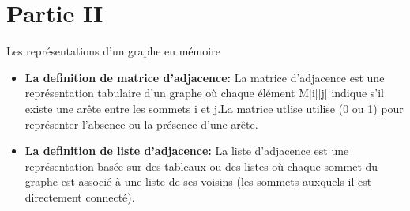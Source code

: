 \documentclass{report}
\begin{document}
\section{Partie II}
Les représentations d’un graphe en mémoire

\begin{itemize}
  \item{\textbf{La definition de matrice d’adjacence: } La matrice d'adjacence est une représentation tabulaire d'un graphe où chaque élément M[i][j] indique s'il existe une arête entre les sommets i et j.La matrice utlise utilise (0 ou 1) pour représenter l'absence ou la présence d'une arête.}
  \item{\textbf{La definition de liste d’adjacence: } La liste d'adjacence est une représentation basée sur des tableaux ou des listes où chaque sommet du graphe est associé à une liste de ses voisins (les sommets auxquels il est directement connecté).}
\end{itemize}
\end{document}
